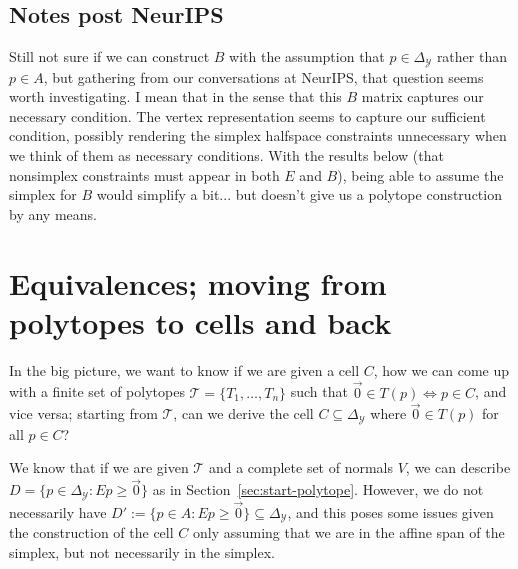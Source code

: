 \documentclass[12pt]{article}
\newcommand{\simplex}{\Delta_\Y}
\newcommand{\T}{\mathcal{T}}
\newcommand{\Y}{\mathcal{Y}}
\begin{document}
  \subsection{Notes post NeurIPS} 
  Still not sure if we can construct $B$ with the assumption that $p \in \simplex$ rather than $p \in A$, but gathering from our conversations at NeurIPS, that question seems worth investigating.
  I mean that in the sense that this $B$ matrix captures our necessary condition.
  The vertex representation seems to capture our sufficient condition, possibly rendering the simplex halfspace constraints unnecessary when we think of them as necessary conditions.
  With the results below (that nonsimplex constraints must appear in both $E$ and $B$), being able to assume the simplex for $B$ would simplify a bit... but doesn't give us a polytope construction by any means.

  \section{Equivalences; moving from polytopes to cells and back}
  
  In the big picture, we want to know if we are given a cell $C$, how we can come up with a finite set of polytopes $\T = \{T_1, \ldots, T_n\}$ such that $\vec 0 \in T(p) \iff p \in C$, and vice versa; starting from $\T$, can we derive the cell $C \subseteq \simplex$ where $\vec 0 \in T(p)$ for all $p \in C$?
  
  We know that if we are given $\T$ and a complete set of normals $V$, we can describe $D = \{p \in \simplex : Ep \geq \vec 0\}$ as in Section~\ref{sec:start-polytope}.
  However, we do not necessarily have $D' := \{p \in A : Ep \geq \vec 0\} \subseteq \simplex$, and this poses some issues given the construction of the cell $C$ only assuming that we are in the affine span of the simplex, but not necessarily in the simplex.
  
\end{document}
